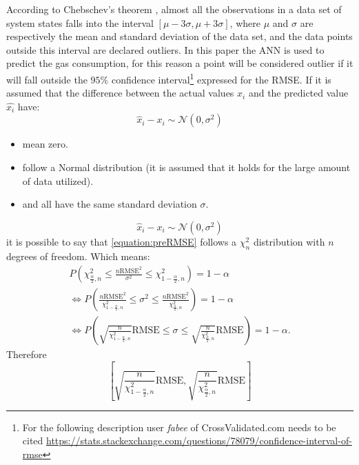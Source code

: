 \documentclass{sig-alternate-sigmod07}
\begin{document}
According to Chebschev's theorem \cite{amidan2005data}, almost all the observations in a data set of system states falls into the interval $[\mu - 3\sigma, \mu+3\sigma]$, where $\mu$ and $\sigma$ are respectively the mean and standard deviation of the data set, and the data points outside this interval are declared outliers. In this paper the ANN is used to predict the gas consumption, for this reason a point will be considered outlier if it will fall outside the $95\%$ confidence interval\footnote{For the following description user \textit{fabee} of CrossValidated.com needs to be cited \url{https://stats.stackexchange.com/questions/78079/confidence-interval-of-rmse}} expressed for the RMSE. If it is assumed that the difference between the actual values $x_i$ and the predicted value $\hat{x_i}$ have:
\begin{equation}
\hat{x}_{i}-x_{i}	\sim	\mathcal{N}\left(0,\sigma^{2}\right)
\end{equation}
\begin{itemize}
\itemsep0em
  \item mean zero.
  \item follow a Normal distribution (it is assumed that it holds for the large amount of data utilized).
  \item and all have the same standard deviation $\sigma$.
\end{itemize}
\begin{equation}
\label{equation:preRMSE}
\hat{x}_{i}-x_{i}	\sim	\mathcal{N}\left(0,\sigma^{2}\right)
\end{equation}
it is possible to say that \cref{equation:preRMSE} follows a $\chi_{n}^{2}$ distribution with $n$ degrees of freedom. Which means:
\begin{align}
P\left(\chi_{\frac{\alpha}{2},n}^{2}\le\frac{n\mbox{RMSE}^{2}}{\sigma^{2}}\le\chi_{1-\frac{\alpha}{2},n}^{2}\right)	=	1-\alpha\\
\Leftrightarrow P\left(\frac{n\mbox{RMSE}^{2}}{\chi_{1-\frac{\alpha}{2},n}^{2}}\le\sigma^{2}\le\frac{n\mbox{RMSE}^{2}}{\chi_{\frac{\alpha}{2},n}^{2}}\right)	=	1-\alpha\\
\Leftrightarrow P\left(\sqrt{\frac{n}{\chi_{1-\frac{\alpha}{2},n}^{2}}}\mbox{RMSE}\le\sigma\le\sqrt{\frac{n}{\chi_{\frac{\alpha}{2},n}^{2}}}\mbox{RMSE}\right)	=	1-\alpha.
\end{align}
Therefore
\begin{equation}
\left[\sqrt{\frac{n}{\chi_{1-\frac{\alpha}{2},n}^{2}}}\mbox{RMSE},\sqrt{\frac{n}{\chi_{\frac{\alpha}{2},n}^{2}}}\mbox{RMSE}\right]
\end{equation}
\end{document}

